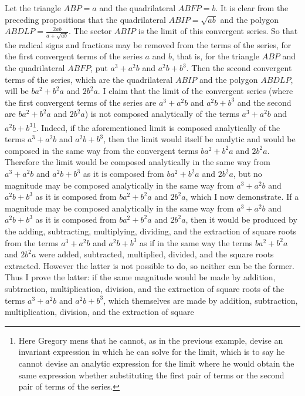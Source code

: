 \documentclass[11pt,letterpaper]{book}
\begin{document}
Let the triangle $ABP = a$ and the quadrilateral $ABFP = b$. 
It is clear from the preceding propositions that the quadrilateral $ABIP =
\sqrt{ab}$ and the polygon $ABDLP = \frac{2ab}{a+\sqrt{ab}}$. 
The sector $ABIP$ is the limit of this convergent series. 
So that the radical signs and fractions may be removed from the
terms of the series, for the first convergent terms of the series $a$ and $b$,
that is, for the triangle $ABP$ and the quadrilateral $ABFP$, put $a^{3}+a^{2}b$
and $a^{2}b+b^{3}$. 
Then the second convergent terms of the series, which are the
quadrilateral $ABIP$ and the polygon $ABDLP$, will be $ba^{2}+b^{2}a$ and 
$2b^{2}a$. 
I claim that the limit of the convergent series (where the first convergent
terms of the series are $a^{3}+a^{2}b$ and $a^{2}b+b^{3}$ and the second are
$ba^{2}+b^{2}a$ and $2b^{2}a$) is not composed analytically of the terms
$a^{3}+a^{2}b$ and $a^{2}b+b^{3}$\footnote{Here Gregory mens that he cannot,
as in the previous example, devise an invariant expression in which he can
solve for the limit, which is to say he cannot devise an analytic expression
for the limit where he would obtain the same expression whether substituting
the first pair of terms or the second pair of terms of the series.}.
Indeed, if the aforementioned limit is composed analytically of the terms
$a^{3}+a^{2}b$ and $a^{2}b+b^{3}$, then the limit would itself be analytic and
would be composed in the same way from the convergent terms $ba^{2}+b^{2}a$
and $2b^{2}a$. 
Therefore the limit would be composed analytically in the same way
from $a^{3}+a^{2}b$ and $a^{2}b+b^{3}$ as it is composed from $ba^{2}+b^{2}a$
and $2b^{2}a$, but no magnitude may be composed analytically in the same way
from $a^{3}+a^{2}b$ and $a^{2}b+b^{3}$ as it is composed from $ba^{2}+b^{2}a$
and $2b^{2}a$, which I now demonstrate. 
If a magnitude may be composed analytically in the same
way from $a^{3}+a^{2}b$ and $a^{2}b+b^{3}$ as it is composed from
$ba^{2}+b^{2}a$ and $2b^{2}a$, then it would be produced by the adding,
subtracting, multiplying, dividing, and the extraction of square roots from the
terms $a^{3}+a^{2}b$ and $a^{2}b+b^{3}$ as if in the same way the terms
$ba^{2}+b^{2}a$ and $2b^{2}a$ were added, subtracted, multiplied, divided, and
the square roots extracted. 
However the latter is not possible to do, so neither can be the former. 
Thus I prove the latter: if the same magnitude would be made by
addition, subtraction, multiplication, division, and the extraction of square
roots of the terms $a^{3}+a^{2}b$ and $a^{2}b+b^{3}$, which themselves are made
by addition, subtraction, multiplication, division, and the extraction of square
\end{document}
